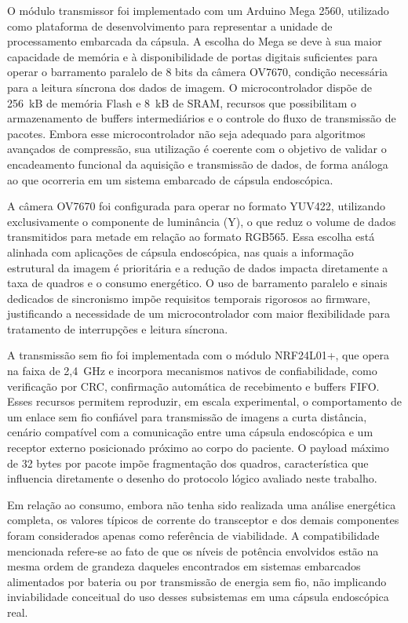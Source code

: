 \documentclass[repeatfields,xlists,xpacks,oneside]{ufrgscca}
\begin{document}
O módulo transmissor foi implementado com um Arduino Mega 2560, utilizado como plataforma de desenvolvimento para representar a unidade de processamento embarcada da cápsula. A escolha do Mega se deve à sua maior capacidade de memória e à disponibilidade de portas digitais suficientes para operar o barramento paralelo de 8 bits da câmera OV7670, condição necessária para a leitura síncrona dos dados de imagem. O microcontrolador dispõe de 256~kB de memória Flash e 8~kB de SRAM, recursos que possibilitam o armazenamento de buffers intermediários e o controle do fluxo de transmissão de pacotes. Embora esse microcontrolador não seja adequado para algoritmos avançados de compressão, sua utilização é coerente com o objetivo de validar o encadeamento funcional da aquisição e transmissão de dados, de forma análoga ao que ocorreria em um sistema embarcado de cápsula endoscópica.

A câmera OV7670 foi configurada para operar no formato YUV422, utilizando exclusivamente o componente de luminância (Y), o que reduz o volume de dados transmitidos para metade em relação ao formato RGB565. Essa escolha está alinhada com aplicações de cápsula endoscópica, nas quais a informação estrutural da imagem é prioritária e a redução de dados impacta diretamente a taxa de quadros e o consumo energético. O uso de barramento paralelo e sinais dedicados de sincronismo impõe requisitos temporais rigorosos ao firmware, justificando a necessidade de um microcontrolador com maior flexibilidade para tratamento de interrupções e leitura síncrona.

A transmissão sem fio foi implementada com o módulo NRF24L01+, que opera na faixa de 2,4~GHz e incorpora mecanismos nativos de confiabilidade, como verificação por CRC, confirmação automática de recebimento e buffers FIFO. Esses recursos permitem reproduzir, em escala experimental, o comportamento de um enlace sem fio confiável para transmissão de imagens a curta distância, cenário compatível com a comunicação entre uma cápsula endoscópica e um receptor externo posicionado próximo ao corpo do paciente. O payload máximo de 32 bytes por pacote impõe fragmentação dos quadros, característica que influencia diretamente o desenho do protocolo lógico avaliado neste trabalho.

Em relação ao consumo, embora não tenha sido realizada uma análise energética completa, os valores típicos de corrente do transceptor e dos demais componentes foram considerados apenas como referência de viabilidade. A compatibilidade mencionada refere-se ao fato de que os níveis de potência envolvidos estão na mesma ordem de grandeza daqueles encontrados em sistemas embarcados alimentados por bateria ou por transmissão de energia sem fio, não implicando inviabilidade conceitual do uso desses subsistemas em uma cápsula endoscópica real.
\end{document}
